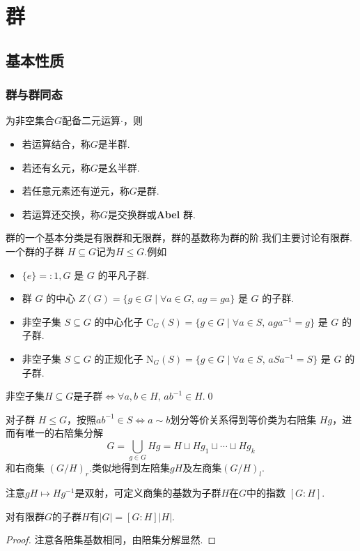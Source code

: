 \chapter{群}
\section{基本性质}
\subsection{群与群同态}
\begin{definition}
	为非空集合$G$配备二元运算$\cdot$，则
	\begin{itemize}
		\item 若运算结合，称$G$是{\heiti 半群}.
		\item 若还有幺元，称$G$是{\heiti 幺半群}.
		\item 若任意元素还有逆元，称$G$是{\heiti 群}.
		\item 若运算还交换，称$G$是{\heiti 交换群}或{\heiti \textbf{Abel} 群}.
	\end{itemize}
\end{definition}

群的一个基本分类是有限群和无限群，群的基数称为群的{\heiti 阶}.我们主要讨论有限群.一个群的{\heiti 子群} $H\subseteq G$记为$H\le G$.例如
\begin{itemize}
	\item $\{e\}=:1,G$ 是 $G$ 的平凡子群.
	\item 群 $G$ 的{\heiti 中心} $Z(G)=\{g\in G\mid \forall a\in G,\,ag=ga\}$ 是 $G$ 的子群.
	\item 非空子集 $S\subseteq G$ 的{\heiti 中心化子} $\mathrm C_G(S)=\{g\in G\mid \forall a\in S,\,aga^{-1}=g\}$ 是 $G$ 的子群.
	\item 非空子集 $S\subseteq G$ 的{\heiti 正规化子} $\mathrm N_G(S)=\{g\in G\mid \forall a\in S,\,aSa^{-1}=S\}$ 是 $G$ 的子群.
\end{itemize}

\begin{lemma}
	非空子集$H\subseteq G$是子群$\iff$$\forall a,b\in H,\,ab^{-1}\in H$.\qed
\end{lemma}

对子群 $H\le G$，按照$ab^{-1}\in S\Leftrightarrow a\sim b$划分等价关系得到等价类为{\heiti 右陪集} $Hg$，进而有唯一的{\heiti 右陪集分解}
\[
	G=\bigcup_{g\in G}Hg=H\sqcup Hg_1\sqcup\cdots\sqcup Hg_k
\]
和{\heiti 右商集} $(G/H)_r$.类似地得到左陪集$gH$及左商集$(G/H)_l$.

注意$gH\mapsto Hg^{-1}$是双射，可定义商集的基数为子群$H$在$G$中的{\heiti 指数} $[G:H]$.
\begin{thm}[(Lagrange)]
	对有限群$G$的子群$H$有$|G|=[G:H]|H|$.
\end{thm}
\begin{proof}
	注意各陪集基数相同，由陪集分解显然.
\end{proof}

